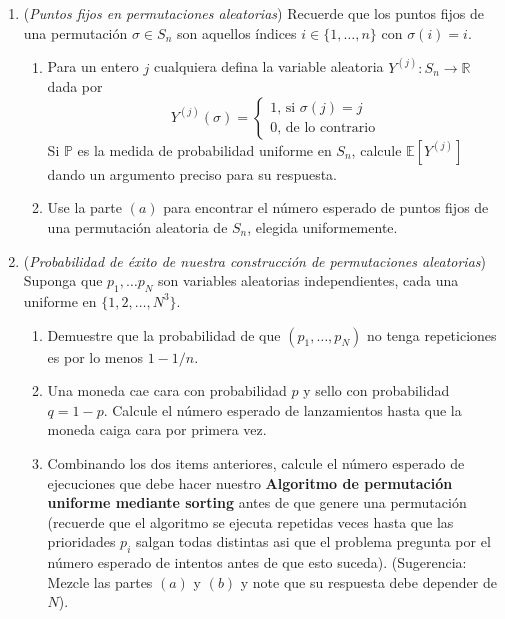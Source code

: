 \documentclass[12pt, a4paper]{article}
\newcommand{\RR}{\mathbb{R}}
\newcommand{\EE}{\mathbb{E}}
\begin{document}
\begin{enumerate}
\item ({\it Puntos fijos en permutaciones aleatorias}) Recuerde que los puntos fijos de una permutación $\sigma\in S_n$ son aquellos índices $i\in \{1,\dots, n\}$ con $\sigma(i)=i$.
\begin{enumerate}
\item Para un entero $j$ cualquiera defina la variable aleatoria $Y^{(j)}:S_n\rightarrow \RR$ dada por
\[Y^{(j)}(\sigma)=
\begin{cases}
1\text{, si $\sigma(j)=j$}\\
0\text{, de lo contrario}
\end{cases}
\]
Si $\mathbb{P}$ es la medida de probabilidad uniforme en $S_n$, calcule $\EE[Y^{(j)}]$ dando un argumento preciso para su respuesta.
\item Use la parte $(a)$ para encontrar el número esperado de puntos fijos de una permutación aleatoria de $S_n$, elegida uniformemente.
\end{enumerate}


\item ({\it Probabilidad de éxito de nuestra construcción de permutaciones aleatorias}) Suponga que $p_1,\dots p_N$ son variables aleatorias independientes, cada una uniforme en $\{1,2,\dots, N^3\}$.
\begin{enumerate}
\item Demuestre que la probabilidad de que $(p_1,\dots,p_N)$ no tenga repeticiones es por lo menos $1-1/n$.
\item Una moneda cae cara con probabilidad $p$ y sello con probabilidad $q=1-p$. Calcule el número esperado de lanzamientos hasta que la moneda caiga cara por primera vez.
\item Combinando los dos items anteriores, calcule el número esperado de ejecuciones que debe hacer nuestro {\bf Algoritmo de permutación uniforme mediante sorting} antes de que genere una permutación (recuerde que el algoritmo se ejecuta repetidas veces hasta que las prioridades $p_i$ salgan todas distintas asi que el problema pregunta por el número esperado de intentos antes de que esto suceda). (Sugerencia: Mezcle las partes $(a)$ y $(b)$ y note que su respuesta debe depender de $N$).
\end{enumerate}


\end{enumerate}
\end{document}
